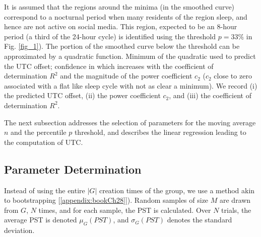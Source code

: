 It is assumed that the regions around the minima (in the smoothed curve) correspond to 
a nocturnal period when many residents of the region sleep, and hence are not active on social media.
This region, expected to be an 8-hour period (a third of the 24-hour cycle) %
is identified using the threshold %
$p=33\%$ in Fig. \ref{fig_1}). 
The portion of the smoothed curve below the threshold can be approximated by a quadratic function. Minimum of the quadratic used to predict the UTC offset; confidence in which increases with the coefficient of determination $R^2$ and the magnitude of the power coefficient $c_2$ ($c_2$ close to zero associated with a flat like sleep cycle with not as clear a minimum).
We record (i) the predicted UTC offset, (ii) the power coefficient $c_2$,  and (iii) the coefficient of determination $R^2$.

The next subsection addresses the selection of  parameters for the moving average $n$ and the percentile $p$ threshold,
and describes the linear regression leading to the computation of UTC.

\subsection{Parameter Determination} \label{parameterDeter} 

Instead of using the entire $|G|$ creation times of the group, we use a method akin to bootstrapping %
[\ref{appendix:bookCh28}]). Random samples of size $M$ are drawn from $G$, $N$ times, and for each sample, the PST is calculated. 
Over $N$ trials, the average PST is denoted $\mu_G({PST})$, 
and $\sigma_G({PST})$ denotes the standard deviation. %

